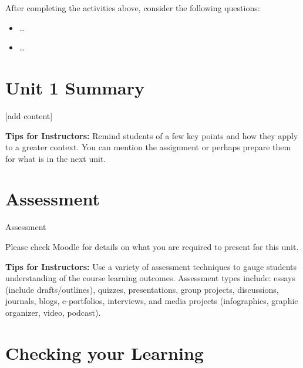 \documentclass[
]{book}
\providecommand{\tightlist}{%
  \setlength{\itemsep}{0pt}\setlength{\parskip}{0pt}}
\begin{document}
After completing the activities above, consider the following questions:

\begin{itemize}
\tightlist
\item
  \ldots{}\\
\item
  \ldots{}
\end{itemize}

\hypertarget{unit-1-summary}{%
\section*{Unit 1 Summary}\label{unit-1-summary}}

{[}add content{]}

\begin{feedback}
\textbf{Tips for Instructors:}
Remind students of a few key points and how they apply to a greater context. You can mention the assignment or perhaps prepare them for what is in the next unit.
\end{feedback}

\hypertarget{assessment-3}{%
\section*{Assessment}\label{assessment-3}}

\begin{assessment}
{Assessment}

Please check Moodle for details on what you are required to present for this unit.
\end{assessment}

\begin{feedback}
\textbf{Tips for Instructors:}
Use a variety of assessment techniques to gauge students understanding of the course learning outcomes. Assessment types include: essays (include drafts/outlines), quizzes, presentations, group projects, discussions, journals, blogs, e-portfolios, interviews, and media projects (infographics, graphic organizer, video, podcast).
\end{feedback}

\hypertarget{checking-your-learning-2}{%
\section*{Checking your Learning}\label{checking-your-learning-2}}
\end{document}
